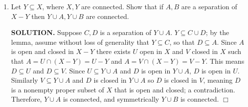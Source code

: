 \documentclass{article}
\begin{document}
\begin{enumerate}
    {\bf SOLUTION.} Suppose $A, B$ is a separation of $X$. If $y \in p(A)$ then $y = p(x)$ for some $x \in A$ and thus $x \in p^{-1}(\{y\})$. Since $p^{-1}(\{y\})$ is connected and intersects $A$, we must have $p^{-1}(\{y\}) \subseteq A$ for any $y \in p(A)$. Hence $p^{-1}(p(A)) \subseteq A$. Since $A \subseteq p^{-1}(p(A))$ is generally true, we have equality, which shows $A$ is saturated. Symmetrically $B$ is saturated. Since $p$ is a quotient map, $p(U), p(V)$ are disjoint nonempty open sets in $Y$ whose union is $Y$; this contradicts the assumption that $Y$ is connected. Thus $X$ must be connected. $\Box$

    \item Let $Y \subseteq X$, where $X, Y$ are connected. Show that if $A, B$ are a separation of $X - Y$ then $Y \cup A, Y \cup B$ are connected.

    {\bf SOLUTION.} Suppose $C, D$ is a separation of $Y \cup A$. $Y \subseteq C \cup D$; by the lemma, assume without loss of generality that $Y \subseteq C$, so that $D \subseteq A$. Since $A$ is open and closed in $X - Y$ there exists $U$ open in $X$ and $V$ closed in $X$ such that $A = U \cap (X-Y) = U - Y$ and $A = V \cap (X - Y) = V - Y$. This means $D \subseteq U$ and $D \subseteq V$. Since $U \subseteq Y \cup A$ and $D$ is open in $Y \cup A$, $D$ is open in $U$. Similarly $V \subseteq Y \cup A$ and $D$ is closed in $Y \cup A$ so $D$ is closed in $V$, meaning $D$ is a nonempty proper subset of $X$ that is open and closed; a contradiction. Therefore, $Y \cup A$ is connected, and symmetrically $Y \cup B$ is connected. $\Box$
\end{enumerate}
\end{document}
